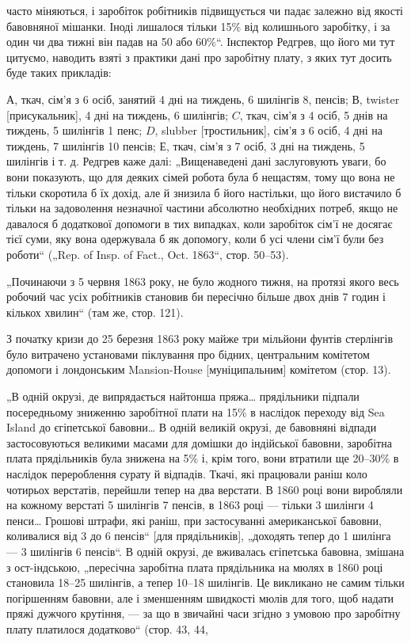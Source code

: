 \parcont{}  %
часто міняються, і заробіток робітників підвищується чи падає
залежно від якості бавовняної мішанки. Іноді лишалося тільки
15\% від колишнього заробітку, і за один чи два тижні він
падав на 50 або 60\%“. Інспектор Редгрев, що його ми тут
цитуємо, наводить взяті з практики дані про заробітну плату,
з яких тут досить буде таких прикладів:

$А$, ткач, сім’я з 6 осіб, занятий 4 дні на тиждень, 6 шилінгів
8, пенсів; $В$, twister [присукальник], 4 дні на тиждень, 6 шилінгів;
$C$, ткач, сім’я з 4 осіб, 5 днів на тиждень, 5 шилінгів
1 пенс; $D$, slubber [тростильник], сім’я з 6 осіб, 4 дні на тиждень,
7 шилінгів 10 пенсів; $Е$, ткач, сім’я з 7 осіб, 3 дні на
тиждень, 5 шилінгів і т. д. Редгрев каже далі: „Вищенаведені
дані заслуговують уваги, бо вони показують, що для деяких
сімей робота була б нещастям, тому що вона не тільки скоротила
б їх дохід, але й знизила б його настільки, що його вистачило
б тільки на задоволення незначної частини абсолютно
необхідних потреб, якщо не давалося б додаткової допомоги
в тих випадках, коли заробіток сім’ї не досягає тієї суми, яку
вона одержувала б як допомогу, коли б усі члени сім’ї були
без роботи“ („Rep. of Insp. of Fact., Oct. 1863“, стор. 50--53).

„Починаючи з 5 червня 1863 року, не було жодного тижня,
на протязі якого весь робочий час усіх робітників становив би
пересічно більше двох днів 7 годин і кількох хвилин“ (там же,
стор. 121).

З початку кризи до 25 березня 1863 року майже три мільйони
фунтів стерлінгів було витрачено установами піклування
про бідних, центральним комітетом допомоги і лондонським
Mansion-House [муніципальним] комітетом (стор. 13).

„В одній окрузі, де випрядається найтонша пряжа\dots{} прядільники
підпали посередньому зниженню заробітної плати на 15\%
в наслідок переходу від Sea Island до єгіпетської бавовни\dots{}
В одній великій окрузі, де бавовняні відпади застосовуються
великими масами для домішки до індійської бавовни, заробітна
плата прядільників була знижена на 5\% і, крім того, вони
втратили ще 20--30\% в наслідок перероблення сурату й відпадів.
Ткачі, які працювали раніш коло чотирьох верстатів, перейшли
тепер на два верстати. В 1860 році вони виробляли на кожному
верстаті 5 шилінгів 7 пенсів, в 1863 році — тільки 3 шилінги
4 пенси\dots{} Грошові штрафи, які раніш, при застосуванні американської
бавовни, коливалися від 3 до 6 пенсів“ [для прядільників],
„доходять тепер до 1 шилінга — 3 шилінгів 6 пенсів“.
В одній окрузі, де вживалась єгіпетська бавовна, змішана
з ост-індською, „пересічна заробітна плата прядільника на мюлях
в 1860 році становила 18--25 шилінгів, а тепер 10--18 шилінгів.
Це викликано не самим тільки погіршенням бавовни,
але і зменшенням швидкості мюлів для того, щоб надати
пряжі дужчого крутіння, — за що в звичайні часи згідно з умовою
про заробітну плату платилося додатково“ (стор. 43, 44,
\parbreak{}  %
